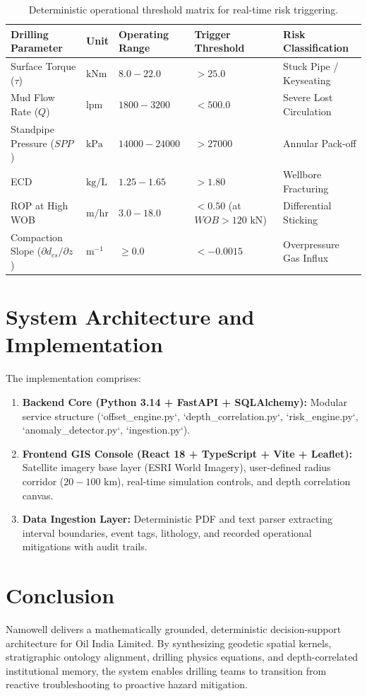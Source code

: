\documentclass[11pt,a4paper]{article}
\begin{document}
\begin{table}[h!]
\centering
\small
\begin{tabularx}{\textwidth}{llXll}
\toprule
\textbf{Drilling Parameter} & \textbf{Unit} & \textbf{Operating Range} & \textbf{Trigger Threshold} & \textbf{Risk Classification} \\
\midrule
Surface Torque ($\tau$) & $\text{kNm}$ & $8.0 - 22.0$ & $> 25.0$ & Stuck Pipe / Keyseating \\
Mud Flow Rate ($Q$) & $\text{lpm}$ & $1800 - 3200$ & $< 500.0$ & Severe Lost Circulation \\
Standpipe Pressure ($SPP$) & $\text{kPa}$ & $14000 - 24000$ & $> 27000$ & Annular Pack-off \\
ECD & $\text{kg/L}$ & $1.25 - 1.65$ & $> 1.80$ & Wellbore Fracturing \\
ROP at High WOB & $\text{m/hr}$ & $3.0 - 18.0$ & $< 0.50$ (at $WOB > 120\text{ kN}$) & Differential Sticking \\
Compaction Slope ($\partial d_{cs} / \partial z$) & $\text{m}^{-1}$ & $\ge 0.0$ & $< -0.0015$ & Overpressure Gas Influx \\
\bottomrule
\end{tabularx}
\caption{Deterministic operational threshold matrix for real-time risk triggering.}
\label{tab:thresholds}
\end{table}

\section{System Architecture and Implementation}
The implementation comprises:
\begin{enumerate}
    \item \textbf{Backend Core (Python 3.14 + FastAPI + SQLAlchemy):} Modular service structure (`offset_engine.py`, `depth_correlation.py`, `risk_engine.py`, `anomaly_detector.py`, `ingestion.py`).
    \item \textbf{Frontend GIS Console (React 18 + TypeScript + Vite + Leaflet):} Satellite imagery base layer (ESRI World Imagery), user-defined radius corridor ($20 - 100\text{ km}$), real-time simulation controls, and depth correlation canvas.
    \item \textbf{Data Ingestion Layer:} Deterministic PDF and text parser extracting interval boundaries, event tags, lithology, and recorded operational mitigations with audit trails.
\end{enumerate}

\section{Conclusion}
Namowell delivers a mathematically grounded, deterministic decision-support architecture for Oil India Limited. By synthesizing geodetic spatial kernels, stratigraphic ontology alignment, drilling physics equations, and depth-correlated institutional memory, the system enables drilling teams to transition from reactive troubleshooting to proactive hazard mitigation.
\end{document}
